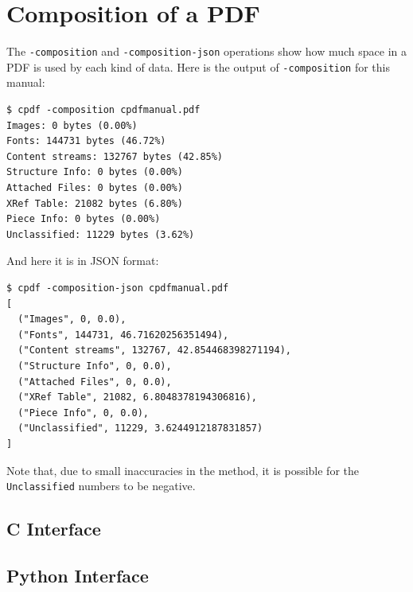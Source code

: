 \documentclass{book}
\begin{document}
\section{Composition of a PDF}

The \texttt{-composition} and \texttt{-composition-json} operations show how much space in a PDF is used by each kind of data. Here is the output of \texttt{-composition} for this manual:

\begin{framed}\small\begin{verbatim}
$ cpdf -composition cpdfmanual.pdf
Images: 0 bytes (0.00%)
Fonts: 144731 bytes (46.72%)
Content streams: 132767 bytes (42.85%)
Structure Info: 0 bytes (0.00%)
Attached Files: 0 bytes (0.00%)
XRef Table: 21082 bytes (6.80%)
Piece Info: 0 bytes (0.00%)
Unclassified: 11229 bytes (3.62%)
\end{verbatim}
\end{framed}\pagestyle{empty}\thispagestyle{fancy}

\noindent And here it is in JSON format:

\begin{framed}\small\begin{verbatim}
$ cpdf -composition-json cpdfmanual.pdf
[
  ("Images", 0, 0.0),
  ("Fonts", 144731, 46.71620256351494),
  ("Content streams", 132767, 42.854468398271194),
  ("Structure Info", 0, 0.0),
  ("Attached Files", 0, 0.0),
  ("XRef Table", 21082, 6.8048378194306816),
  ("Piece Info", 0, 0.0),
  ("Unclassified", 11229, 3.6244912187831857)
]
\end{verbatim}
\end{framed}\pagestyle{empty}\thispagestyle{fancy}

\noindent Note that, due to small inaccuracies in the method, it is possible for the \texttt{Unclassified} numbers to be negative.

\begin{cpdflib}
\clearpage
\section*{C Interface}
\begin{small}\tt

\end{small}
\end{cpdflib}

\begin{pycpdflib}
\clearpage
\section*{Python Interface}
\begin{small}\tt

\end{small}
\end{pycpdflib}
\end{document}
